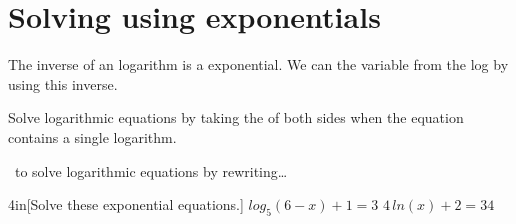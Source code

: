 \section{Solving using exponentials}

The inverse of an logarithm is a exponential.
We can  the variable from the log by using this inverse.

Solve logarithmic equations by taking the  of both sides 
when the equation contains a single logarithm.

\begin{myConceptSteps}{~to solve logarithmic equations by rewriting\dots}
\end{myConceptSteps}

\begin{my2Problems}[\normalsize]{4in}[Solve these exponential equations.]
    {
        $log_5(6-x) + 1 = 3$
    }
    {
        $4\,ln(x) + 2 = 34$
    }
\end{my2Problems}

